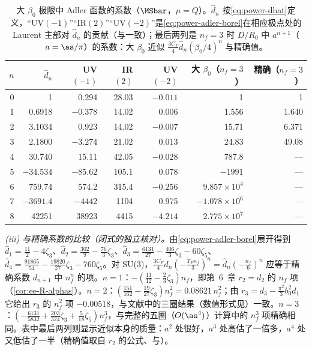 \begin{example}[带 $n$ 个费米子泡的单胶子]
\begin{table}[htbp]
\centering\small
\caption{大 $\beta_0$ 极限中 Adler 函数的系数（$\MSbar$，$\mu=Q$）。$\hat d_n$ 按\eqref{eq:power-dhat}定义，“UV$(-1)$”“IR$(2)$”“UV$(-2)$”是\eqref{eq:power-adler-borel}在相应极点处的 Laurent 主部对 $\hat d_n$ 的贡献（与\cite[表~5]{Beneke1999}一致）；最后两列是 $n_f=3$ 时 $D/R_0$ 中 $a^{n+1}$（$a=\as/\pi$）的系数：大 $\beta_0$ 近似 $\frac{3C_F}{4}\hat d_n(\beta_0/4)^n$ 与精确值。}
\label{tab:power-adler-coeffs}
\begin{tabular}{@{}rrrrrrr@{}}
\toprule
$n$ & $\hat d_n$ & UV$(-1)$ & IR$(2)$ & UV$(-2)$ & 大 $\beta_0$（$n_f=3$） & 精确（$n_f=3$）\\
\midrule
0 & 1 & 0.294 & 28.03 & $-0.011$ & 1 & 1 \\
1 & 0.6918 & $-0.378$ & 14.02 & 0.006 & 1.556 & 1.640 \\
2 & 3.1034 & 0.923 & 14.02 & $-0.007$ & 15.71 & 6.371 \\
3 & 2.1800 & $-3.274$ & 21.02 & 0.013 & 24.83 & 49.08 \\
4 & 30.740 & 15.11 & 42.05 & $-0.028$ & 787.8 & --- \\
5 & $-34.534$ & $-85.62$ & 105.1 & 0.078 & $-1991$ & --- \\
6 & 759.74 & 574.2 & 315.4 & $-0.256$ & $9.857\times10^4$ & --- \\
7 & $-3691.4$ & $-4442$ & 1104 & 0.975 & $-1.078\times10^6$ & --- \\
8 & 42251 & 38923 & 4415 & $-4.214$ & $2.775\times10^7$ & --- \\
\bottomrule
\end{tabular}
\end{table}

\emph{(iii) 与精确系数的比较（闭式的独立核对）。}由\eqref{eq:power-adler-borel}展开得到 $\hat d_1=\frac{11}{2}-4\zeta_3$、$\hat d_2=\frac{302}{9}-\frac{76}{3}\zeta_3$、$\hat d_3=\frac{6131}{27}-\frac{406}{3}\zeta_3-60\zeta_5$、$\hat d_4=\frac{91865}{54}-\frac{19820}{27}\zeta_3-760\zeta_5$。对 SU(3)，$\frac{3C_F}{4}\hat d_n(-\frac{T_Fn_f}3)^n=\hat d_n(-\frac{n_f}6)^n$ 应等于精确系数 $d_{n+1}$ 中 $n_f^n$ 的项。$n=1$：$-(\frac{11}{12}-\frac23\zeta_3)n_f$，即第~6~章 $r_2=d_2$ 的 $n_f$ 项（\cref{cor:ee-R-alphas}）。$n=2$：$(\frac{151}{162}-\frac{19}{27}\zeta_3)n_f^2=0.08621\,n_f^2$；由 $r_3=d_3-\frac{\pi^2}{3}b_0^2d_1$ 它给出 $r_3$ 的 $n_f^2$ 项 $-0.00518$，与文献中的三圈结果\cite{GorishniiKataevLarin1991,SurguladzeSamuel1991}（数值形式见\cite[式~(5)]{BaikovChetyrkinKuhn2008}）一致。$n=3$：$(-\frac{6131}{5832}+\frac{203}{324}\zeta_3+\frac5{18}\zeta_5)n_f^3$，与完整的五圈（$O(\as^4)$）计算中的 $n_f^3$ 项\cite[式~(4)]{BaikovChetyrkinKuhn2008}精确相同。表中最后两列则显示近似本身的质量：$a^2$ 处很好，$a^3$ 处高估了一倍多，$a^4$ 处又低估了一半（精确值取自 $r_2$ 的公式、\cite[表~4]{Beneke1999}与\cite[式~(8)]{BaikovChetyrkinKuhn2008}）。


\end{example}
